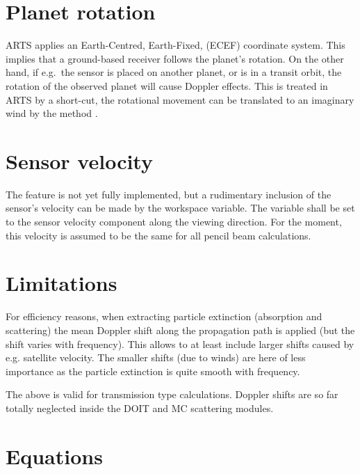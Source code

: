 \section{Planet rotation}

ARTS applies an Earth-Centred, Earth-Fixed, (ECEF) coordinate system. This
implies that a ground-based receiver follows the planet's rotation. On the
other hand, if e.g.\ the sensor is placed on another planet, or is in a transit
orbit, the rotation of the observed planet will cause Doppler effects. This is
treated in ARTS by a short-cut, the rotational movement can be translated to an
imaginary wind by the method .


\section{Sensor velocity}

The feature is not yet fully implemented, but a rudimentary inclusion of the
sensor's velocity can be made by the  workspace
variable. The variable shall be set to the sensor velocity component along the
viewing direction. For the moment, this velocity is assumed to be the same for
all pencil beam calculations.


\section{Limitations}
\label{sec:winds:limitations}
%
For efficiency reasons, when extracting particle extinction (absorption and
scattering) the mean Doppler shift along the propagation path is applied (but
the shift varies with frequency). This allows to at least include larger shifts
caused by e.g. satellite velocity. The smaller shifts (due to winds) are here
of less importance as the particle extinction is quite smooth with frequency.

The above is valid for transmission type calculations. Doppler shifts are so
far totally neglected inside the DOIT and MC scattering modules.



\section{Equations}
\label{sec:winds:eqs}

